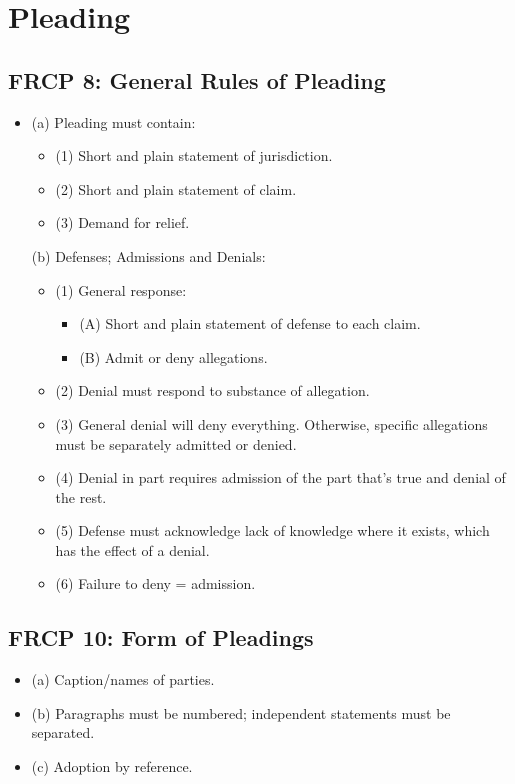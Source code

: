 \section{Pleading}

\subsection{FRCP 8: General Rules of Pleading}

\begin{itemize}
    \item (a) Pleading must contain:
    \begin{itemize}
        \item (1) Short and plain statement of jurisdiction.
        \item (2) Short and plain statement of claim.
        \item (3) Demand for relief.
    \end{itemize}
    (b) Defenses; Admissions and Denials:
    \begin{itemize}
        \item (1) General response:
        \begin{itemize}
            \item (A) Short and plain statement of defense to each claim.
            \item (B) Admit or deny allegations.
        \end{itemize}
        \item (2) Denial must respond to substance of allegation.
        \item (3) General denial will deny everything. Otherwise, specific allegations must be separately admitted or denied.
        \item (4) Denial in part requires admission of the part that's true and denial of the rest.
        \item (5) Defense must acknowledge lack of knowledge where it exists, which has the effect of a denial.
        \item (6) Failure to deny = admission.
    \end{itemize}
\end{itemize}

\subsection{FRCP 10: Form of Pleadings}

\begin{itemize}
    \item (a) Caption/names of parties.
    \item (b) Paragraphs must be numbered; independent statements must be separated.
    \item (c) Adoption by reference.
\end{itemize}

